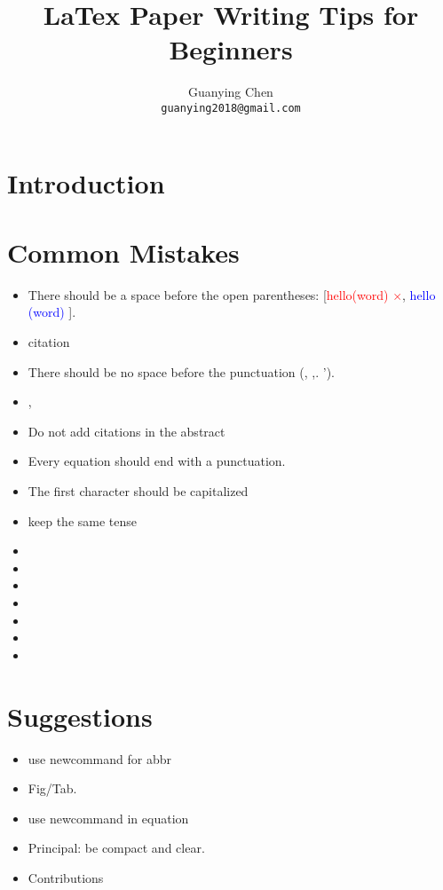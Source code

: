 \documentclass[10pt,twocolumn,letterpaper]{article}
\newcommand{\correct}[1]{\textcolor{blue}{#1 \checkmark}}
\newcommand{\wrong}[1]{\textcolor{red}{#1 $\times$}}
\begin{document}
\title{LaTex Paper Writing Tips for Beginners}

\author{Guanying Chen \\
{\tt\small guanying2018@gmail.com}
}
\maketitle
{
    \hypersetup{linkcolor=black}
    \tableofcontents
}



\vspace{6em}
\section{Introduction}
\label{sec:intro}

\section{Common Mistakes}
\begin{itemize}
    \item There should be a space before the open parentheses: [\wrong{hello(word)}, \correct{hello (word)}].
    \item citation
    \item There should be no space before the punctuation (\eg, ,. ').
    \item \ie, \eg
    \item Do not add citations in the abstract
    \item Every equation should end with a punctuation.
    \item The first character should be capitalized
    \item keep the same tense
    \item
    \item
    \item
    \item
    \item
    \item
    \item
\end{itemize}

\section{Suggestions}
\begin{itemize}
    \item use newcommand for abbr
    \item Fig/Tab.
    \item use newcommand in equation
    \item Principal: be compact and clear.
    \item Contributions
\end{itemize}
\end{document}
